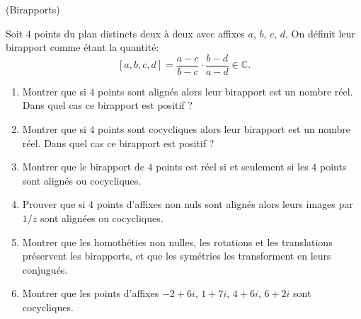 \documentclass[a4paper,12pt,reqno]{amsart}
\begin{document}
\begin{exo} (Birapports)

  Soit $4$ points du plan distincts deux à deux avec affixes $a$, $b$, $c$, $d$. On définit leur birapport comme étant la quantité:
  $$
    [a,b,c,d]=\frac{a-c}{b-c}\cdot\frac{b-d}{a-d} \in \mathbb{C}.
  $$
  \begin{enumerate}
    \item Montrer que si $4$ points sont alignés alors leur birapport est un nombre réel. Dans quel cas ce birapport est positif ?
    \item Montrer que si $4$ points sont cocycliques alors leur birapport est un nombre réel. Dans quel cas ce birapport est positif ?
    \item Montrer que le birapport de $4$ points est réel si et seulement si les $4$ points sont alignés ou cocycliques.
    \item Prouver que si $4$ points d'affixes non nuls sont alignés alors leurs images par $1/\overline{z}$ sont alignées ou cocycliques.
    \item Montrer que les homothéties non nulles, les rotations et les translations préservent les birapports, et que les symétries les transforment en leurs conjugués.
    \item Montrer que les points d'affixes $-2+6i$, $1+7i$, $4+6i$, $6+2i$ sont cocycliques.
  \end{enumerate}
\end{exo}
\end{document}
